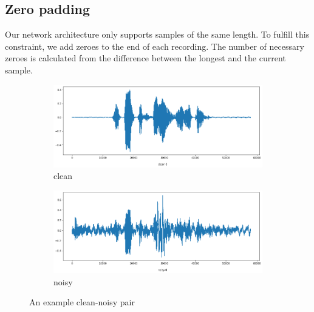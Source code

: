 \documentclass[12pt]{article}
\begin{document}
	\subsection{Zero padding} \label{pad}
	Our network architecture only supports samples of the same length. To fulfill this constraint, we add zeroes to the end of each recording. The number of necessary zeroes is calculated from the difference between the longest and the current sample.
	
	
	\begin{figure}[H]
		\centering
		\begin{subfigure}{.5\textwidth}
			\centering
			\includegraphics[width=.8\linewidth]{wave_clean}
			\caption{clean}
			\label{fig:wave_clean}
		\end{subfigure}%
		\begin{subfigure}{.5\textwidth}
			\centering
			\includegraphics[width=.8\linewidth]{wave_noisy}
			\caption{noisy}
			\label{fig:wave_noisy}
		\end{subfigure}
		\caption{An example clean-noisy pair}
		\label{fig:clean_noisy}
		

\end{figure}
\end{document}
